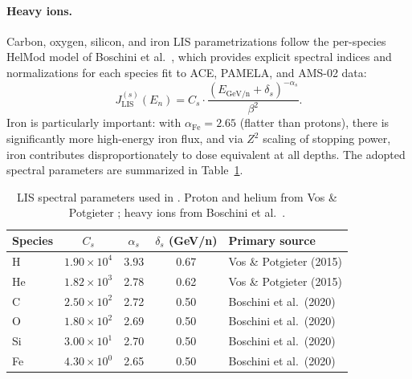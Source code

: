\paragraph{Heavy ions.}
Carbon, oxygen, silicon, and iron LIS parametrizations follow the per-species
HelMod model of Boschini et al.\ \cite{boschini2020}, which provides explicit spectral indices
and normalizations for each species fit to ACE, PAMELA, and AMS-02 data:
\begin{equation}
  J_\mathrm{LIS}^{(s)}(E_n) = C_s \cdot
  \frac{(E_\mathrm{GeV/n} + \delta_s)^{-\alpha_s}}{\beta^2}.
  \label{eq:lis_heavy}
\end{equation}
Iron is particularly important: with $\alpha_\mathrm{Fe} = 2.65$ (flatter than
protons), there is significantly more high-energy iron flux, and via
$Z^2$ scaling of stopping power, iron contributes disproportionately to
dose equivalent at all depths.
The adopted spectral parameters are summarized in Table~\ref{tab:lis_params}.

\begin{table}[H]
  \centering
  \caption{LIS spectral parameters used in .
           Proton and helium from Vos \& Potgieter \cite{vos2015}; heavy ions from
           Boschini et al.\ \cite{boschini2020}.}
  \label{tab:lis_params}
  \begin{tabular}{lcccl}
    \toprule
    Species & $C_s$ & $\alpha_s$ & $\delta_s$ (GeV/n) & Primary source \\
    \midrule
    H       & $1.90\times10^4$ & 3.93 & 0.67 & Vos \& Potgieter (2015) \\
    He      & $1.82\times10^3$ & 2.78 & 0.62 & Vos \& Potgieter (2015) \\
    C       & $2.50\times10^2$ & 2.72 & 0.50 & Boschini et al.\ (2020) \\
    O       & $1.80\times10^2$ & 2.69 & 0.50 & Boschini et al.\ (2020) \\
    Si      & $3.00\times10^1$ & 2.70 & 0.50 & Boschini et al.\ (2020) \\
    Fe      & $4.30\times10^0$ & 2.65 & 0.50 & Boschini et al.\ (2020) \\
    \bottomrule
  \end{tabular}
\end{table}

